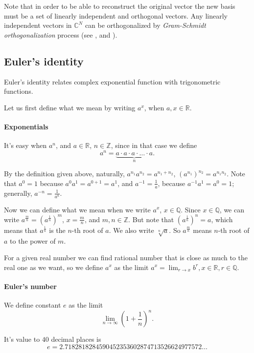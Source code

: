\documentclass[10pt]{article}
\begin{document}
Note that in order to be able to reconstruct the original vector the new basis
must be a set of linearly independent and orthogonal vectors. Any linearly
independent vectors in $\mathbb{C}^N$ can be orthogonalized by {\it
Gram-Schmidt orthogonalization} process (see \cite{Smith}, \cite{Matthews2010}
and \cite{Axler1997}).

\centerline{}

\subsection*{Euler's identity} Euler's identity relates complex exponential
function with trigonometric functions.

Let us first define what we mean by writing $a^x$, when $a, x \in \mathbb{R}$. 

\paragraph{Exponentials} It's easy when $a^n$, and $a \in \mathbb{R}$, $n \in
\mathbb{Z}$, since in that case we define 
$$a^n=\underbrace{a\cdot a \cdot a \cdot \ldots \cdot a}_{n}.$$

By the definition given above, naturally, $a^{n_1}a^{n_2}=a^{n_1+n_2}$,
$(a^{n_1})^{n_2}=a^{n_1n_2}$. Note that $a^0=1$ because $a^0a^1=a^{0+1}=a^1$,
and $a^{-1}=\frac{1}{a}$, because $a^{-1}a^1=a^0=1$; generally,
$a^{-n}=\frac{1}{a^n}$. 

Now we can define what we mean when we write $a^x$, $x \in \mathbb{Q}$. Since
$x \in \mathbb{Q}$, we can write $a^{\frac{m}{n}} = (a^\frac{1}{n})^m$,
$x=\frac{m}{n}$, and $m, n \in \mathbb{Z}$. But note that
$(a^{\frac{1}{n}})^n=a$, which means that $a^{\frac{1}{n}}$ is the $n$-th root
of $a$. We also write $\sqrt[n]{a}$. So $a^{\frac{m}{n}}$ means
$n$-th root of $a$ to the power of $m$.

For a given real number we can find rational number that is close as much to
the real one as we want, so we define $a^x$ as the limit $a^x=\lim_{r\to x}b^r,
x \in \mathbb{R}, r \in \mathbb{Q}$.

\paragraph{Euler's number} We define constant $e$ as the limit
\cite{Strang1991} $$\lim_{n \to \infty}\left(1 + \frac{1}{n}\right)^n.$$

It's value to $40$ decimal places is \cite{Knuth2007} $$e =
2.7182818284590452353602874713526624977572\ldots$$
\end{document}
